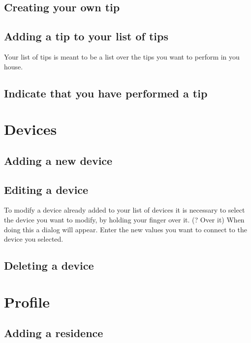 \subsection{Creating your own tip}
\subsection{Adding a tip to your list of tips}
Your list of tips is meant to be a list over the tips you want to perform in you house. 
\subsection{Indicate that you have performed a tip}

\label{sec:devices}
\section{Devices}
\subsection{Adding a new device}
\subsection{Editing a device}
To modify a device already added to your list of devices it is necessary to select the device you want to modify, by holding your finger over it. (? Over it) When doing this a dialog will appear. Enter the new values you want to connect to the device you selected. 
\subsection{Deleting a device}

\section{Profile}
\subsection{Adding a residence}
